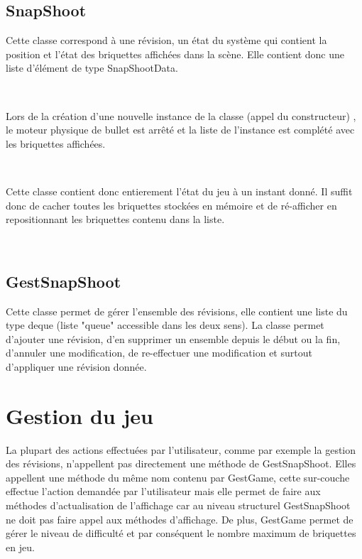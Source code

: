 \documentclass[frenchb,twoside]{EPURapport}
\begin{document}
			\subsection{SnapShoot}

			Cette classe correspond à une révision, un état du système qui contient la position
			et l'état des briquettes affichées dans la scène.
			Elle contient donc une liste d'élément de type SnapShootData.

			\

			Lors de la création d'une nouvelle instance de la classe (appel du constructeur)
			, le moteur physique de bullet est arrêté et la liste de l'instance est complété
			avec les briquettes affichées.

			\

			Cette classe contient donc entierement l'état du jeu à un instant donné.
			Il suffit donc de cacher toutes les briquettes stockées en mémoire et de
			ré-afficher en repositionnant les briquettes contenu dans la liste.
			
			\
		
			\subsection{GestSnapShoot}
			Cette classe permet de gérer l'ensemble des révisions, elle contient
			une liste du type deque (liste "queue" accessible dans les deux sens).
			La classe permet d'ajouter une révision, d'en supprimer un ensemble depuis
			le début ou la fin, d'annuler une modification, de re-effectuer une modification
			 et surtout d'appliquer une révision donnée.
			 
        

    \section{Gestion du jeu}
    
		La plupart des actions effectuées par l'utilisateur, comme par exemple la gestion
		des révisions, n'appellent pas directement une méthode de GestSnapShoot. Elles appellent
		une méthode du même nom contenu par GestGame, cette sur-couche effectue l'action demandée
		par l'utilisateur mais elle permet de faire aux méthodes d'actualisation de l'affichage
		car au niveau structurel GestSnapShoot ne doit pas faire appel aux méthodes d'affichage.
		De plus, GestGame permet de gérer le niveau de difficulté et par conséquent le nombre maximum
		de briquettes en jeu.
\end{document}
